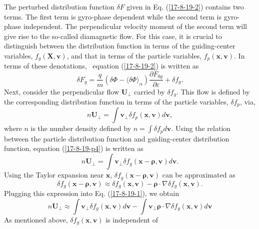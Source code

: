 \documentclass{article}
\newcommand{\tmmathbf}[1]{\ensuremath{\boldsymbol{#1}}}
\begin{document}
The perturbed distribution function $\delta F$ given in Eq. (\ref{17-8-19-2})
contains two terms. The first term is gyro-phase dependent while the second
term is gyro-phase independent. The perpendicular velocity moment of the
second term will give rise to the so-called diamagnetic flow. For this case,
it is crucial to distinguish between the distribution function in terms of the
guiding-center variables, $f_g (\mathbf{X}, \mathbf{v})$, and that in terms of
the particle variables, $f_p (\mathbf{x}, \mathbf{v})$. In terms of these
denotations, \ equation (\ref{17-8-19-2}) is written as
\begin{equation}
  \delta F_g = \frac{q}{m} (\delta \Phi - \langle \delta \Phi
  \rangle_{\alpha}) \frac{\partial F_{0 g}}{\partial \varepsilon} + \delta f_g
  .
\end{equation}
Next, consider the perpendicular flow $\mathbf{U}_{\perp}$ carried by $\delta
f_g$. This flow is defined by the corresponding distribution function in terms
of the particle variables, $\delta f_p$, via,
\begin{equation}
  \label{17-8-19-p4} n\mathbf{U}_{\perp} = \int \mathbf{v}_{\perp} \delta f_p
  (\mathbf{x}, \mathbf{v}) d\mathbf{v},
\end{equation}
where $n$ is the number density defined by $n = \int \delta f_p d\mathbf{v}$.
Using the relation between the particle distribution function and
guiding-center distribution function, equation (\ref{17-8-19-p4}) is written
as
\begin{equation}
  \label{17-8-19-1} n\mathbf{U}_{\perp} = \int \mathbf{v}_{\perp} \delta f_g
  (\mathbf{x}-\tmmathbf{\rho}, \mathbf{v}) d\mathbf{v}.
\end{equation}
Using the Taylor expansion near $\mathbf{x}$, $\delta f_g
(\mathbf{x}-\tmmathbf{\rho}, \mathbf{v})$ can be approximated as
\begin{equation}
  \delta f_g (\mathbf{x}-\tmmathbf{\rho}, \mathbf{v}) \approx \delta f_g
  (\mathbf{x}, \mathbf{v}) -\tmmathbf{\rho} \cdot \nabla \delta f_g
  (\mathbf{x}, \mathbf{v}) .
\end{equation}
Plugging this expression into Eq. (\ref{17-8-19-1}), we obtain
\begin{equation}
  \label{17-8-19-3} n\mathbf{U}_{\perp} \approx \int \mathbf{v}_{\perp} \delta
  f_g (\mathbf{x}, \mathbf{v}) d\mathbf{v}- \int \mathbf{v}_{\perp}
  \tmmathbf{\rho} \cdot \nabla \delta f_g (\mathbf{x}, \mathbf{v}) d\mathbf{v}
\end{equation}
As mentioned above, $\delta f_g (\mathbf{x}, \mathbf{v})$ is independent of
\end{document}
